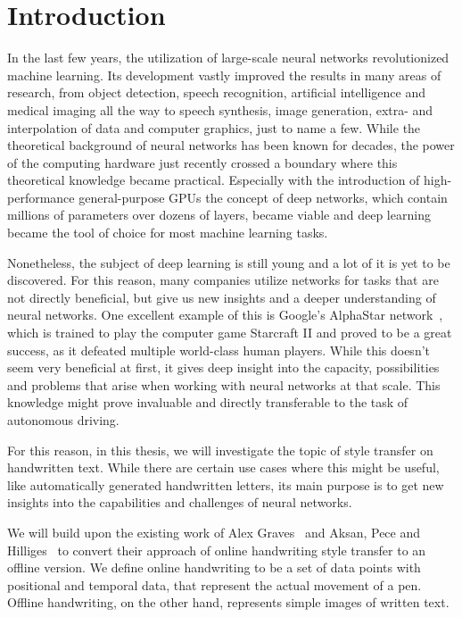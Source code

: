 \chapter{Introduction}\label{chapter:introduction}

In the last few years, the utilization of large-scale neural networks revolutionized machine learning. Its development vastly improved the results in many areas of research, from object detection, speech recognition, artificial intelligence and medical imaging all the way to speech synthesis, image generation, extra- and interpolation of data and computer graphics, just to name a few. While the theoretical background of neural networks has been known for decades, the power of the computing hardware just recently crossed a boundary where this theoretical knowledge became practical. Especially with the introduction of high-performance general-purpose GPUs the concept of deep networks, which contain millions of parameters over dozens of layers, became viable and deep learning became the tool of choice for most machine learning tasks.

Nonetheless, the subject of deep learning is still young and a lot of it is yet to be discovered. For this reason, many companies utilize networks for tasks that are not directly beneficial, but give us new insights and a deeper understanding of neural networks. One excellent example of this is Google's AlphaStar network~\cite{alphastar}, which is trained to play the computer game Starcraft II and proved to be a great success, as it defeated multiple world-class human players. While this doesn't seem very beneficial at first, it gives deep insight into the capacity, possibilities and problems that arise when working with neural networks at that scale. This knowledge might prove invaluable and directly transferable to the task of autonomous driving.

For this reason, in this thesis, we will investigate the topic of style transfer on handwritten text. While there are certain use cases where this might be useful, like automatically generated handwritten letters, its main purpose is to get new insights into the capabilities and challenges of neural networks.

We will build upon the existing work of Alex Graves~\cite{graves} and Aksan, Pece and Hilliges~\cite{deepwriting} to convert their approach of online handwriting style transfer to an offline version. We define online handwriting to be a set of data points with positional and temporal data, that represent the actual movement of a pen. Offline handwriting, on the other hand, represents simple images of written text.

